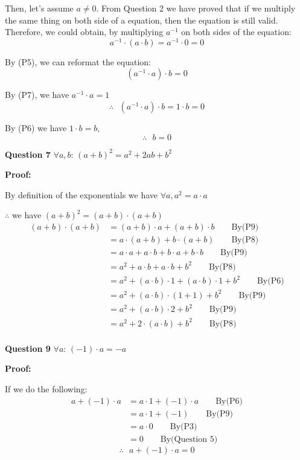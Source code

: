 \documentclass[a4paper,12pt]{report}
\begin{document}
\noindent
Then, let's assume $a\neq 0$. From Question 2 we have proved that if we multiply the same thing on both side of a equation, then the equation is still valid. Therefore, we could obtain, by multiplying $a^{-1}$ on both sides of the equation:\[a^{-1}\cdot{(a\cdot{b})} = a^{-1}\cdot{0} = 0\]

\noindent
By (P5), we can reformat the equation:\[(a^{-1}\cdot{a})\cdot{b} =0\]

\noindent
By (P7), we have $a^{-1}\cdot{a} = 1$\[\therefore \text{ }(a^{-1}\cdot{a})\cdot{b} = 1\cdot{b} = 0\]

\noindent
By (P6) we have $1\cdot{b} = b$,\[\therefore \text{ } b = 0\]

\noindent
\textbf{Question 7} $\forall a,b$: $(a+b)^2=a^2+2ab+b^2$

\noindent
\textbf{Proof:}

\noindent
By definition of the exponentials we have $\forall a, a^2 = a\cdot{a}$

\noindent
$\therefore$ we have $(a+b)^2 = (a+b)\cdot{(a+b)}$
\begin{align*}
 (a+b)\cdot{(a+b)} & = (a+b)\cdot{a} + (a+b)\cdot{b}\qquad \text{By(P9)}\\
      & = a\cdot{(a+b)} + b\cdot{(a+b)} \qquad \text{By(P8)}\\
      & = a\cdot{a} + a\cdot{b} + b\cdot{a} + b\cdot{b} \qquad \text{By(P9)}\\
      & = a^2 + a\cdot{b} + a\cdot{b} + b^2 \qquad \text{By(P8)}\\
      & = a^2 + (a\cdot{b})\cdot{1} + (a\cdot{b})\cdot{1} + b^2 \qquad \text{By(P6)}\\
      & = a^2 + (a\cdot{b})\cdot{(1+1)} + b^2 \qquad \text{By(P9)}\\
      & = a^2 + (a\cdot{b})\cdot{2} + b^2 \qquad \text{By(P9)}\\
      & = a^2 + 2\cdot{(a\cdot{b})} + b^2\qquad \text{By(P8)}\\
\end{align*}

\noindent
\textbf{Question 9} $\forall a$: $(-1)\cdot{a}=-a$

\noindent
\textbf{Proof:}

\noindent
If we do the following: 
\begin{align*}
 a + (-1)\cdot{a} & = a\cdot{1} + (-1)\cdot{a}\qquad \text{By(P6)}\\
      & = a\cdot{1+(-1)}\qquad \text{By(P9)}\\
      & = a\cdot{0}\qquad \text{By(P3)}\\
      & = 0 \qquad \text{By(Question 5)}
\end{align*}
\[\therefore \text{ } a + (-1)\cdot{a} = 0\]
\end{document}
